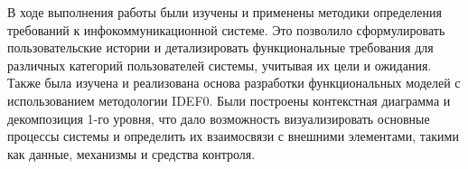 В ходе выполнения работы были изучены и применены методики определения
требований к инфокоммуникационной системе. Это позволило сформулировать
пользовательские истории и детализировать функциональные требования для
различных категорий пользователей системы, учитывая их цели и ожидания. Также
была изучена и реализована основа разработки функциональных моделей с
использованием методологии IDEF0. Были построены контекстная диаграмма и
декомпозиция 1-го уровня, что дало возможность визуализировать основные процессы
системы и определить их взаимосвязи с внешними элементами, такими как данные,
механизмы и средства контроля.
